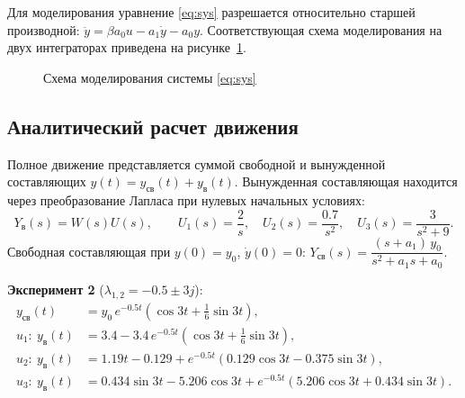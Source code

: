 \documentclass[14pt,a4paper]{extarticle}
\begin{document}
Для моделирования уравнение \eqref{eq:sys} разрешается относительно старшей производной: $\ddot y = \beta a_0 u - a_1\dot y - a_0 y$. Соответствующая схема моделирования на двух интеграторах приведена на рисунке~\ref{fig:scheme}.

\begin{figure}[H]
\centering
{}
\caption{Схема моделирования системы \eqref{eq:sys}}
\label{fig:scheme}
\end{figure}

\subsection{Аналитический расчет движения}

Полное движение представляется суммой свободной и вынужденной составляющих $y(t) = y_\text{св}(t) + y_\text{в}(t)$. Вынужденная составляющая находится через преобразование Лапласа при нулевых начальных условиях:
\[
Y_\text{в}(s) = W(s)U(s), \qquad U_1(s) = \frac{2}{s},\quad U_2(s) = \frac{0.7}{s^2},\quad U_3(s) = \frac{3}{s^2+9}.
\]
Свободная составляющая при $y(0) = y_0$, $\dot y(0) = 0$: $Y_\text{св}(s) = \dfrac{(s + a_1)\,y_0}{s^2 + a_1 s + a_0}$. 

\textbf{Эксперимент 2} ($\lambda_{1,2} = -0.5 \pm 3j$):
\begin{align*}
y_\text{св}(t) &= y_0\, e^{-0.5t}\left(\cos 3t + \tfrac16 \sin 3t\right),\\
u_1:\ y_\text{в}(t) &= 3.4 - 3.4\,e^{-0.5t}\left(\cos 3t + \tfrac16\sin 3t\right),\\
u_2:\ y_\text{в}(t) &= 1.19t - 0.129 + e^{-0.5t}\left(0.129\cos 3t - 0.375\sin 3t\right),\\
u_3:\ y_\text{в}(t) &= 0.434\sin 3t - 5.206\cos 3t + e^{-0.5t}\left(5.206\cos 3t + 0.434\sin 3t\right).
\end{align*}
\end{document}
